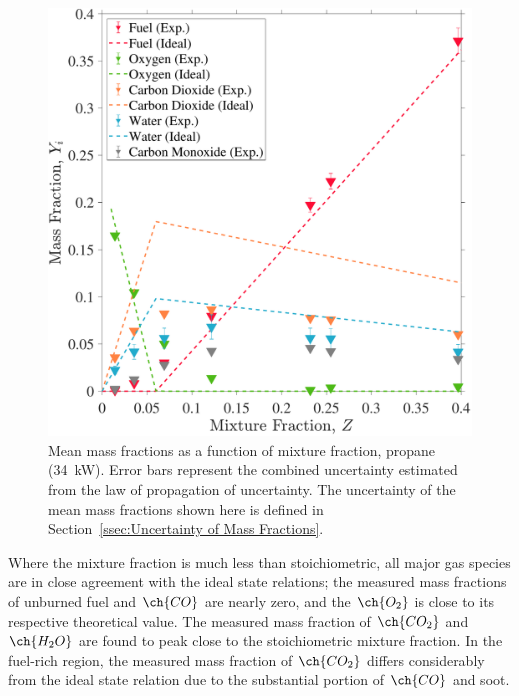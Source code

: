 \documentclass[12pt]{article}
\begin{document}
\begin{figure}[!]
	\centering
\includegraphics[width=\textwidth,keepaspectratio]{Adjusted_FuelPropane 34KW_Mixture_Fraction_Intermediate_Plot.pdf}
	\caption[Mean mass fractions as a function of mixture fraction, propane (34~kW)]{Mean mass fractions as a function of mixture fraction, propane (34~kW). Error bars represent the combined uncertainty estimated from the law of propagation of uncertainty. The uncertainty of the mean mass fractions shown here is defined in Section~\ref{ssec:Uncertainty of Mass Fractions}.}
	\label{fig:Propane34kW_Mix_Frac}
\end{figure}

Where the mixture fraction is much less than stoichiometric, all major gas species are in close agreement with the ideal state relations; the measured mass fractions of unburned fuel and $\ch{CO}$ are nearly zero, and the $\ch{O_2}$ is close to its respective theoretical value. The measured mass fraction of $\ch{CO_{2}}$ and $\ch{H_{2}O}$ are found to peak close to the stoichiometric mixture fraction. In the fuel-rich region, the measured mass fraction of $\ch{CO_{2}}$ differs considerably from the ideal state relation due to the substantial portion of $\ch{CO}$ and soot.


\clearpage
\end{document}

